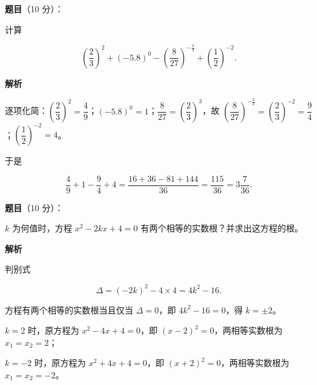 \begin{answer}

\textbf{题目}（10 分）：

计算

\nopagebreak[4]
\[
\left(\frac{2}{3}\right)^{2}+(-5.8)^{0}-\left(\frac{8}{27}\right)^{-\frac{2}{3}}+\left(\frac{1}{2}\right)^{-2}.
\]

\textbf{解析}

逐项化简：$\left(\dfrac{2}{3}\right)^{2}=\dfrac{4}{9}$；$(-5.8)^{0}=1$；$\dfrac{8}{27}=\left(\dfrac{2}{3}\right)^{3}$，故 $\left(\dfrac{8}{27}\right)^{-\frac{2}{3}}=\left(\dfrac{2}{3}\right)^{-2}=\dfrac{9}{4}$；$\left(\dfrac{1}{2}\right)^{-2}=4$。

于是

\nopagebreak[4]
\[
\frac{4}{9}+1-\frac{9}{4}+4
=\frac{16+36-81+144}{36}
=\frac{115}{36}=3\frac{7}{36}.
\]


\end{answer}
\begin{answer}

\textbf{题目}（10 分）：

$k$ 为何值时，方程 $x^{2}-2kx+4=0$ 有两个相等的实数根？并求出这方程的根。

\textbf{解析}

判别式

\nopagebreak[4]
\[
\Delta=(-2k)^{2}-4\times 4=4k^{2}-16.
\]

方程有两个相等的实数根当且仅当 $\Delta=0$，即 $4k^{2}-16=0$，得 $k=\pm 2$。

$k=2$ 时，原方程为 $x^{2}-4x+4=0$，即 $(x-2)^{2}=0$，两相等实数根为 $x_1=x_2=2$；

$k=-2$ 时，原方程为 $x^{2}+4x+4=0$，即 $(x+2)^{2}=0$，两相等实数根为 $x_1=x_2=-2$。


\end{answer}
